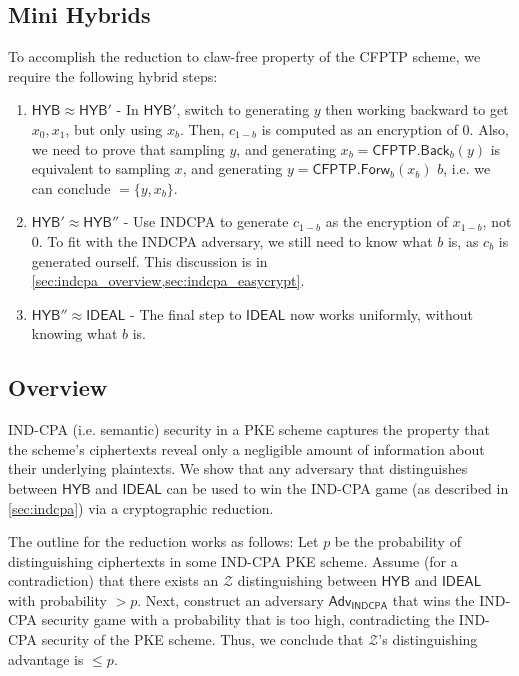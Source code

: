 \documentclass{article}[12pt]
\newcommand{\Indcpa}{\mathsf{INDCPA}}
\newcommand{\CFPTP}{\mathsf{CFPTP}}
\newcommand{\Forw}{\mathsf{Forw}}
\newcommand{\Back}{\mathsf{Back}}
\newcommand{\Adversary}{{\mathsf{Adv}}} %
\newcommand{\Environment}{{\mathcal{Z}}} %
\newcommand{\IndcpaAdversary}{{\Adversary_\Indcpa}}
\newcommand{\Ideal}{{\mathsf{IDEAL}}}
\newcommand{\Hyb}{{\mathsf{HYB}}}
\begin{document}
\subsection{Mini Hybrids}
To accomplish the reduction to claw-free property of the CFPTP scheme, we require the following hybrid steps:
\begin{enumerate}
	\item\label{hyb:2.1} $\Hyb \approx \Hyb'$ - In $\Hyb'$, switch to generating $y$ then working backward to get $x_0,x_1$, but only using $x_b$. Then, $c_{1-b}$ is computed as an encryption of $0$.
	Also, we need to prove that sampling $y$, and generating $x_b = \CFPTP.\Back_b(y)$ is equivalent to sampling $x$, and generating $y = \CFPTP.\Forw_b(x_b)$ $b$, i.e. we can conclude $=\{y, x_b\}$.

	\item\label{hyb:2.2} $\Hyb' \approx \Hyb''$ - Use INDCPA to generate $c_{1-b}$ as the encryption of $x_{1-b}$, not $0$. To fit with the INDCPA adversary, we still need to know what $b$ is, as $c_b$ is generated ourself. This discussion is in \cref{sec:indcpa_overview,sec:indcpa_easycrypt}.

	\item\label{hyb:2.3} $\Hyb'' \approx \Ideal$ - The final step to $\Ideal$ now works uniformly, without knowing what $b$ is.
\end{enumerate}

\subsection{Overview}\label{sec:indcpa_overview}
IND-CPA (i.e. semantic) security in a PKE scheme captures the property that the scheme's ciphertexts reveal only a negligible amount of information about their underlying plaintexts. We show that any adversary that distinguishes between $\Hyb$ and $\Ideal$ can be used to win the IND-CPA game (as described in \cref{sec:indcpa}) via a cryptographic reduction.

The outline for the reduction works as follows: Let $p$ be the probability of distinguishing ciphertexts in some IND-CPA PKE scheme. Assume (for a contradiction) that there exists an $\Environment$ distinguishing between $\Hyb$ and $\Ideal$ with probability $> p$. Next, construct an adversary $\IndcpaAdversary$ that wins the IND-CPA security game with a probability that is too high, contradicting the IND-CPA security of the PKE scheme. Thus, we conclude that $\Environment$'s distinguishing advantage is $\leq p$.
\end{document}
